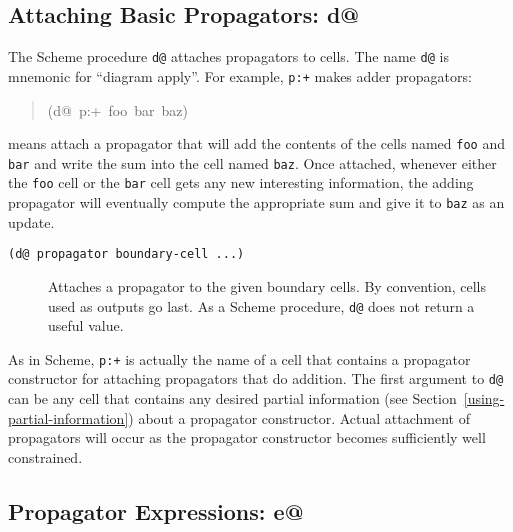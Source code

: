 \documentclass[12pt,letterpaper,english]{article}
\begin{document}

\hypertarget{attaching-basic-propagators-d}{}
\subsection{Attaching Basic Propagators: d@}
\label{attaching-basic-propagators-d}

The Scheme procedure \texttt{d@} attaches propagators to cells.  The
name \texttt{d@} is mnemonic for ``diagram apply''.  For
example, \texttt{p:+} makes adder propagators:
\begin{quote}{\ttfamily \raggedright \noindent
(d@~p:+~foo~bar~baz)
}\end{quote}
means attach a propagator that will add the contents of the cells
named \texttt{foo} and \texttt{bar} and write the sum into the cell named \texttt{baz}.
Once attached, whenever either the \texttt{foo} cell or the \texttt{bar} cell
gets any new interesting information, the adding propagator will
eventually compute the appropriate sum and give it to \texttt{baz} as an
update.
\begin{description}
\item[{\texttt{(d@ propagator boundary-cell ...)}}] \leavevmode 
Attaches a propagator to the given boundary cells.  By convention,
cells used as outputs go last.  As a Scheme procedure, \texttt{d@} does
not return a useful value.

\end{description}

As in Scheme, \texttt{p:+} is actually the name of a cell that contains a
propagator constructor for attaching propagators that do addition.
The first argument to \texttt{d@} can be any cell that contains any desired
partial information (see Section~\ref{using-partial-information})
about a propagator constructor.
Actual attachment of propagators will occur as the propagator
constructor becomes sufficiently well constrained.



\hypertarget{propagator-expressions-e}{}
\subsection{Propagator Expressions: e@}
\label{propagator-expressions-e}
\end{document}
